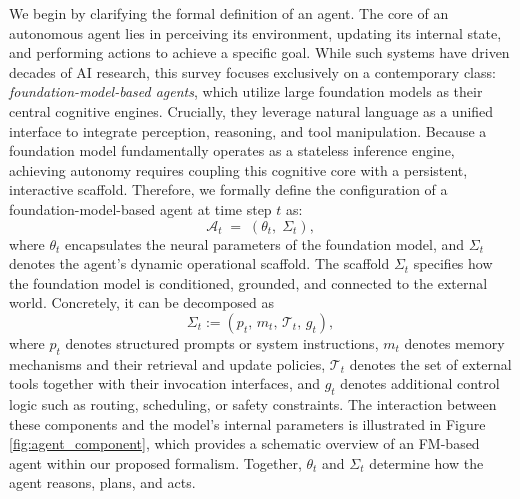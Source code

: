 \documentclass{article}
\begin{document}
We begin by clarifying the formal definition of an agent. The core of an autonomous agent lies in perceiving its environment, updating its internal state, and performing actions to achieve a specific goal. While such systems have driven decades of AI research, this survey focuses exclusively on a contemporary class: \textit{foundation-model-based agents}, which utilize large foundation models as their central cognitive engines. Crucially, they leverage natural language as a unified interface to integrate perception, reasoning, and tool manipulation. Because a foundation model fundamentally operates as a stateless inference engine, achieving autonomy requires coupling this cognitive core with a persistent, interactive scaffold. Therefore, we formally define the configuration of a foundation-model-based agent at time step $t$ as:
\begin{equation}
\label{eq:agent_formalism}
\mathcal{A}_t \;=\; (\theta_t,\; \Sigma_t),
\end{equation}
where $\theta_t$ encapsulates the neural parameters of the foundation model, and $\Sigma_t$ denotes the agent's dynamic operational scaffold. The scaffold $\Sigma_t$ specifies how the foundation model is conditioned, grounded, and connected to the external world. Concretely, it can be decomposed as
\begin{equation}
\label{eq:scaffold_formalism}
\Sigma_t := (p_t,\, m_t,\, \mathcal{T}_t,\, g_t),
\end{equation}
where $p_t$ denotes structured prompts or system instructions, $m_t$ denotes memory mechanisms and their retrieval and update policies, 
$\mathcal{T}_t$ denotes the set of external tools together with their invocation interfaces, and 
$g_t$ denotes additional control logic such as routing, scheduling, or safety constraints. The interaction between these components and the model's internal parameters is illustrated in Figure \ref{fig:agent_component}, which provides a schematic overview of an FM-based agent within our proposed formalism. Together, 
$\theta_t$ and $\Sigma_t$ determine how the agent reasons, plans, and acts.
\end{document}
